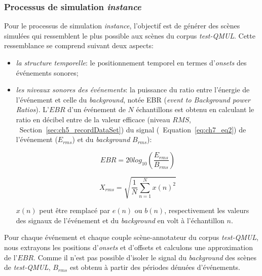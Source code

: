 
\subsubsection{Processus de simulation \emph{instance}}
\label{sec:ch7_simuProcessInstance}

Pour le processus de simulation \emph{instance}, l'objectif est de générer des scènes simulées qui ressemblent le plus possible aux scènes du corpus \emph{test-QMUL}. Cette ressemblance se comprend suivant deux aspects:

\begin{itemize}
\item \emph{la structure temporelle}: le positionnement temporel en termes d'\emph{onsets} des événements sonores;
\item \emph{les niveaux sonores des événements}: la puissance du ratio entre l'énergie de l'événement et celle du \emph{background}, notée EBR (\emph{event to Background power Ratios}). L'$EBR$ d'un événement de $N$ échantillons est obtenu en calculant le ratio en décibel entre de la valeur efficace (niveau $RMS$, \cf~Section~\ref{sec:ch5_recordDataSet}) du signal (\cf~Equation~\ref{eq:ch7_eq2}) de l'événement ($E_{rms}$) et du \emph{background}  $B_{rms}$):

\begin{equation}
\label{eq:ch7_eq1}
EBR=20log_{10} \left(  \dfrac{E_{rms}}{B_{rms}} \right) 
\end{equation}

\begin{equation}
\label{eq:ch7_eq2}
X_{rms}=\sqrt{\dfrac{1}{N} \sum_{n=1}^{N} x(n)^2}
\end{equation}

$x(n)$ peut être remplacé par $e(n)$ ou $b(n)$, respectivement les valeurs des signaux de l'événement et du \emph{background} en volt à l'échantillon $n$. 
\end{itemize}


Pour chaque événement et chaque couple scène-annotateur du corpus \emph{test-QMUL}, nous extrayons les positions d'\emph{onsets} et d'{offsets} et calculons une approximation de l'$EBR$. Comme il n'est pas possible d'isoler le signal du \emph{background} des scènes de \emph{test-QMUL}, $B_{rms}$ est obtenu à partir des périodes dénuées d'événements. \\
 
 \\

